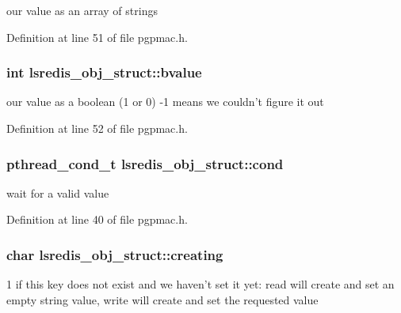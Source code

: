 our value as an array of strings 



Definition at line 51 of file pgpmac.\-h.

\hypertarget{structlsredis__obj__struct_ac3df3eaa275c1e8e333024c1fa8353af}{
\subsubsection[{bvalue}]{\setlength{\rightskip}{0pt plus 5cm}int lsredis\-\_\-obj\-\_\-struct\-::bvalue}}\label{structlsredis__obj__struct_ac3df3eaa275c1e8e333024c1fa8353af}


our value as a boolean (1 or 0) -\/1 means we couldn't figure it out 



Definition at line 52 of file pgpmac.\-h.

\hypertarget{structlsredis__obj__struct_a356f6a228bb19ac7d66fdb1c875d68be}{
\subsubsection[{cond}]{\setlength{\rightskip}{0pt plus 5cm}pthread\-\_\-cond\-\_\-t lsredis\-\_\-obj\-\_\-struct\-::cond}}\label{structlsredis__obj__struct_a356f6a228bb19ac7d66fdb1c875d68be}


wait for a valid value 



Definition at line 40 of file pgpmac.\-h.

\hypertarget{structlsredis__obj__struct_ae0aa00ad745ee5bbc598c23ab794ed8a}{
\subsubsection[{creating}]{\setlength{\rightskip}{0pt plus 5cm}char lsredis\-\_\-obj\-\_\-struct\-::creating}}\label{structlsredis__obj__struct_ae0aa00ad745ee5bbc598c23ab794ed8a}


1 if this key does not exist and we haven't set it yet\-: read will create and set an empty string value, write will create and set the requested value 



